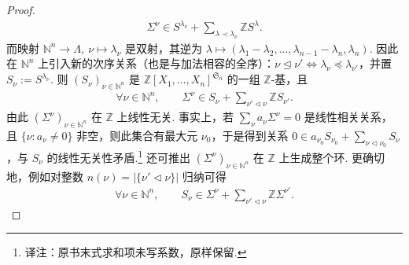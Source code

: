 \begin{proof}
\begin{align*}
\Sigma^\nu\in S^{\lambda_\nu}+\sum_{\lambda\prec\lambda_\nu}\mathbb Z S^\lambda.
\end{align*}
而映射 $\mathbb N^n\to\Lambda,\ \nu\mapsto\lambda_\nu$ 是双射，其逆为 $\lambda\mapsto(\lambda_1-\lambda_2,\ldots,\lambda_{n-1}-\lambda_n,\lambda_n)$. 因此在 $\mathbb N^n$ 上引入新的次序关系（也是与加法相容的全序）：$\nu\trianglelefteq\nu'\Longleftrightarrow\lambda_\nu\preccurlyeq\lambda_{\nu'}$，并置 $S_\nu:=S^{\lambda_\nu}$. 则 $(S_\nu)_{\nu\in\mathbb N^n}$ 是 $\mathbb Z[X_1,\ldots,X_n]^{\mathfrak S_n}$ 的一组 $\mathbb Z$-基，且
\begin{align*}
\forall\nu\in\mathbb N^n,\qquad\Sigma^\nu\in S_\nu+\sum_{\nu'\triangleleft\nu}\mathbb Z S_{\nu'}.
\end{align*}
由此 $(\Sigma^\nu)_{\nu\in\mathbb N^n}$ 在 $\mathbb Z$ 上线性无关. 事实上，若 $\sum_\nu a_\nu\Sigma^\nu=0$ 是线性相关关系，且 $\{\nu:a_\nu\ne0\}$ 非空，则此集合有最大元 $\nu_0$，于是得到关系 $0\in a_{\nu_0}S_{\nu_0}+\sum_{\nu\triangleleft\nu_0}S_\nu$，与 $S_\nu$ 的线性无关性矛盾.\footnote{译注：原书末式求和项未写系数，原样保留.}
还可推出 $(\Sigma^\nu)_{\nu\in\mathbb N^n}$ 在 $\mathbb Z$ 上生成整个环. 更确切地，例如对整数 $n(\nu)=|\{\nu'\triangleleft\nu\}|$ 归纳可得
\begin{align*}
\forall\nu\in\mathbb N^n,\qquad S_\nu\in\Sigma^\nu+\sum_{\nu'\triangleleft\nu}\mathbb Z\Sigma^{\nu'}.
\end{align*}
\end{proof}
